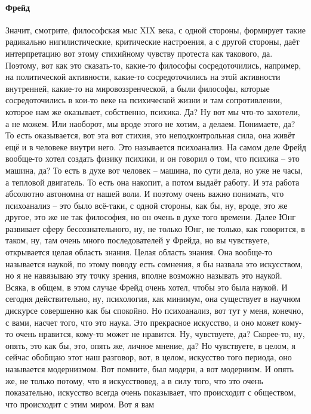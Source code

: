 \paragraph{Фрейд}
Значит, смотрите, философская мыс XIX века, с одной стороны, формирует
такие радикально нигилистические, критические настроения, а с другой стороны,
даёт интерпретацию вот этому стихийному чувству протеста как такового, да.
Поэтому, вот как это сказать-то, какие-то философы сосредоточились, например, на
политической активности, какие-то сосредоточились на этой активности внутренней,
какие-то на мировоззренческой, а были философы, которые сосредоточились в кои-то
веке на психической жизни и там сопротивлении, которое нам же оказывает,
собственно, психика. Да? Ну вот мы что-то захотели, а не можем. Или наоборот, мы
вроде этого не хотим, а делаем. Понимаете, да? То есть оказывается, вот эта вот
стихия, это неподконтрольная сила, она живёт ещё и в человеке внутри него. Это
называется психоанализ. На самом деле
Фрейд вообще-то хотел создать физику психики, и он говорил о том, что психика –
это машина, да? То есть в духе вот человек – машина, по сути дела, но уже не
часы, а тепловой двигатель. То есть она накопит, а потом выдаёт работу. И эта
работа абсолютно автономна от нашей воли. И поэтому очень важно понимать, что
психоанализ – это было всё-таки, с одной стороны, как бы, ну, вроде, это же
другое, это же не так философия, но он очень в духе того времени. Далее Юнг
развивает сферу бессознательного, ну, не только Юнг, не только, как говорится, в
таком, ну, там очень много последователей у Фрейда, но вы чувствуете,
открывается целая область знания. Целая область знания. Она вообще-то называется
наукой, по этому поводу есть сомнения, я бы назвала это искусством, но я не
навязываю эту точку зрения, вполне возможно называть это наукой. Всяка, в общем,
в этом случае Фрейд очень хотел, чтобы это была наукой. И сегодня действительно,
ну, психология, как минимум, она существует в научном дискурсе совершенно как бы
спокойно. Но психоанализ, вот тут у меня, конечно, с вами, насчет того, что это
наука. Это прекрасное искусство, и оно может кому-то очень нравится, кому-то
может не нравится. Ну, чувствуете, да? Скорее-то, ну, опять, это как бы, это,
опять же, личное мнение, да? Но чувствуете, в целом, я сейчас обобщаю этот наш
разговор, вот, в целом, искусство того периода, оно называется модернизмом. Вот
помните, был модерн, а вот модернизм. И опять же, не только потому, что я
искусствовед, а в силу того, что это очень показательно, искусство всегда очень
показывает, что происходит с обществом, что происходит с этим миром. Вот я вам
